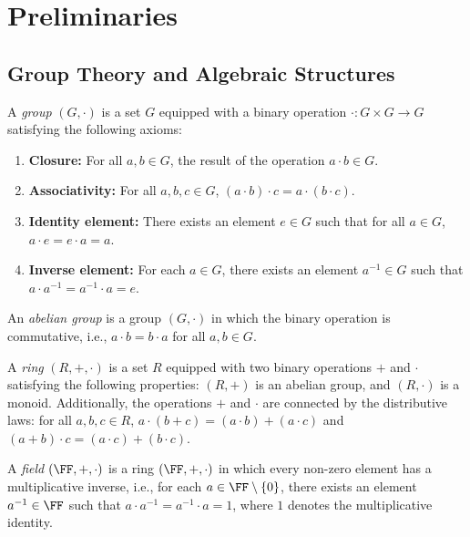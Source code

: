 \documentclass{iacrcc}
\begin{document}
\appendix

\section{Preliminaries}

\subsection{Group Theory and Algebraic Structures}

\begin{definition}[Group]
A \textit{group} $(G, \cdot)$ is a set $G$ equipped with a binary operation $\cdot : G \times G \to G$ satisfying the following axioms:
\begin{enumerate}
\item \textbf{Closure:} For all $a, b \in G$, the result of the operation $a \cdot b \in G$.
\item \textbf{Associativity:} For all $a, b, c \in G$, $(a \cdot b) \cdot c = a \cdot (b \cdot c)$.
\item \textbf{Identity element:} There exists an element $e \in G$ such that for all $a \in G$, $a \cdot e = e \cdot a = a$.
\item \textbf{Inverse element:} For each $a \in G$, there exists an element $a^{-1} \in G$ such that $a \cdot a^{-1} = a^{-1} \cdot a = e$.
\end{enumerate}
\end{definition}

\begin{definition}
An \textit{abelian group} is a group $(G, \cdot)$ in which the binary operation is commutative, i.e., $a \cdot b = b \cdot a$ for all $a, b \in G$.
\end{definition}

\begin{definition}[Ring]
A \textit{ring} $(R, +, \cdot)$ is a set $R$ equipped with two binary operations $+$ and $\cdot$ satisfying the following properties: $(R, +)$ is an abelian group, and $(R, \cdot)$ is a monoid. Additionally, the operations $+$ and $\cdot$ are connected by the distributive laws: for all $a, b, c \in R$, $a \cdot (b + c) = (a \cdot b) + (a \cdot c)$ and $(a + b) \cdot c = (a \cdot c) + (b \cdot c)$.
\end{definition}

\begin{definition}[Field]
A \textit{field} $(\FF, +, \cdot)$ is a ring $(\FF, +, \cdot)$ in which every non-zero element has a multiplicative inverse, i.e., for each $a \in \FF \setminus \{0\}$, there exists an element $a^{-1} \in \FF$ such that $a \cdot a^{-1} = a^{-1} \cdot a = 1$, where $1$ denotes the multiplicative identity.
\end{definition}
\end{document}
